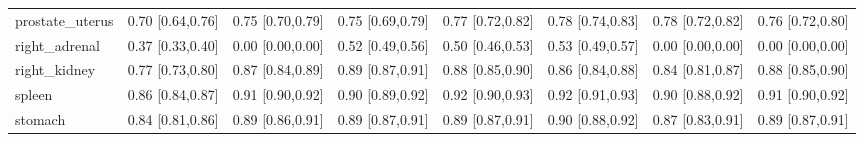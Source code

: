 \begin{tabular}{lccccccc}
prostate\_uterus & 0.70 [0.64,0.76] & 0.75 [0.70,0.79] & 0.75 [0.69,0.79] & 0.77 [0.72,0.82] & 0.78 [0.74,0.83] & 0.78 [0.72,0.82] & 0.76 [0.72,0.80] \\
right\_adrenal & 0.37 [0.33,0.40] & 0.00 [0.00,0.00] & 0.52 [0.49,0.56] & 0.50 [0.46,0.53] & 0.53 [0.49,0.57] & 0.00 [0.00,0.00] & 0.00 [0.00,0.00] \\
right\_kidney & 0.77 [0.73,0.80] & 0.87 [0.84,0.89] & 0.89 [0.87,0.91] & 0.88 [0.85,0.90] & 0.86 [0.84,0.88] & 0.84 [0.81,0.87] & 0.88 [0.85,0.90] \\
spleen & 0.86 [0.84,0.87] & 0.91 [0.90,0.92] & 0.90 [0.89,0.92] & 0.92 [0.90,0.93] & 0.92 [0.91,0.93] & 0.90 [0.88,0.92] & 0.91 [0.90,0.92] \\
stomach & 0.84 [0.81,0.86] & 0.89 [0.86,0.91] & 0.89 [0.87,0.91] & 0.89 [0.87,0.91] & 0.90 [0.88,0.92] & 0.87 [0.83,0.91] & 0.89 [0.87,0.91] \\
\bottomrule
\end{tabular}
